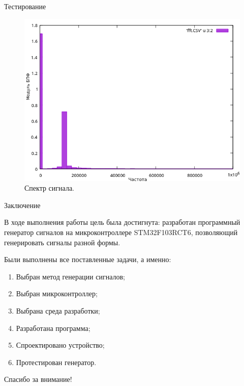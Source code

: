 \documentclass[10pt]{beamer}
\begin{document}
\begin{frame}{Тестирование}
  \begin{figure}
  \includegraphics[width=1\textwidth]{fft}
  \caption{Спектр сигнала.}
  \end{figure}
\end{frame}

\begin{frame}{Заключение}

	В ходе выполнения работы цель была достигнута: разработан программный генератор сигналов на микроконтроллере STM32F103RCT6, позволяющий генерировать сигналы разной формы.
	
\vspace{0.25cm}	
	Были выполнены все поставленные задачи, а именно:
	\begin{enumerate}
		\item Выбран метод генерации сигналов;
		\item Выбран микроконтроллер;
		\item Выбрана среда разработки;
		\item Разработана программа;
		\item Спроектировано устройство;
		\item Протестирован генератор.
	\end{enumerate}
	
	
	

\end{frame}

\begin{frame}
\begin{center}
{\Huge Спасибо за внимание! }
\end{center}
\end{frame}
\end{document}
